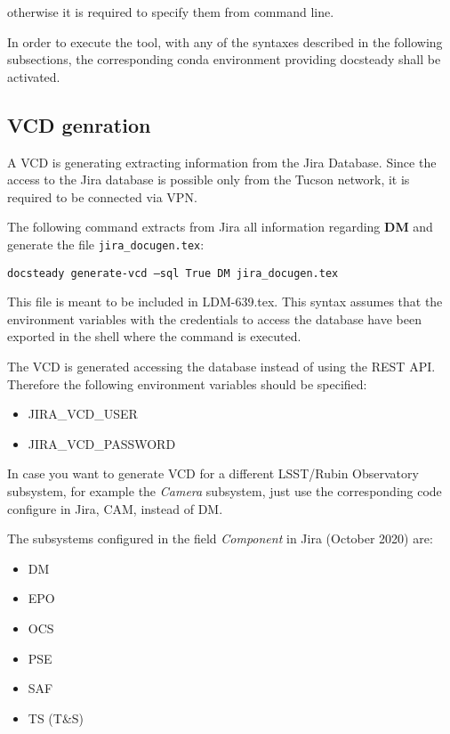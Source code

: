 \documentclass[DM]{lsstdoc}
\begin{document}
otherwise it is required to specify them from command line.

In order to execute the tool, with any of the syntaxes described in the following subsections, the corresponding conda environment providing docsteady shall be activated.



\subsection{VCD genration}

A VCD is generating extracting information from the Jira Database.
Since the access to the Jira database is possible only from the Tucson network, it is required to be connected via VPN.

The following command extracts from Jira all information regarding \textbf{DM} and generate the file \texttt{jira\_docugen.tex}:

\texttt{docsteady generate-vcd --sql True DM jira\_docugen.tex}

This file is meant to be included in LDM-639.tex.
This syntax assumes that the environment variables with the credentials to access the database have been exported in the shell where the command is executed.

The VCD is generated accessing the database instead of using the REST API. Therefore the following environment variables should be specified:

\begin{itemize}
\item JIRA\_VCD\_USER
\item JIRA\_VCD\_PASSWORD
\end{itemize}

In case you want to generate VCD for a different LSST/Rubin Observatory subsystem, for example the \textit{Camera} subsystem,
just use the corresponding code configure in Jira, CAM, instead of DM.

The subsystems configured in the field \textit{Component} in Jira (October 2020) are:
\begin{itemize}
\item DM
\item EPO
\item OCS
\item PSE
\item SAF
\item TS (T\&S)
\end{itemize}
\end{document}
